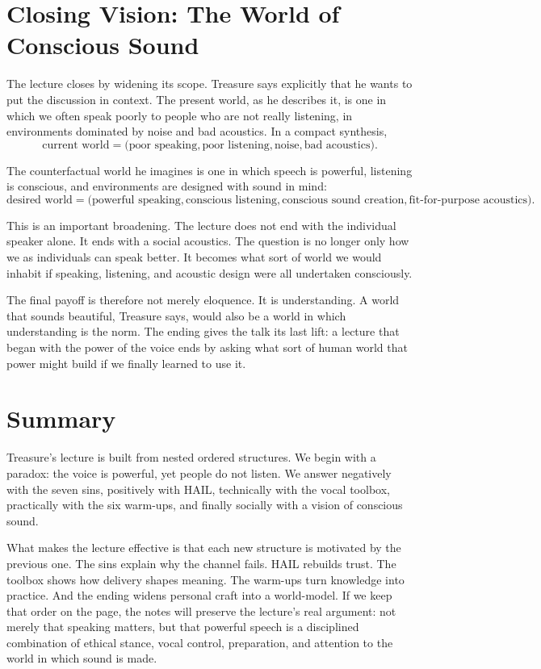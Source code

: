 \section{Closing Vision: The World of Conscious Sound}

The lecture closes by widening its scope. Treasure says explicitly that he wants to put the discussion in context. The present world, as he describes it, is one in which we often speak poorly to people who are not really listening, in environments dominated by noise and bad acoustics. In a compact synthesis,
\begin{equation}
\text{current world}
=
\bigl(
\text{poor speaking},
\text{poor listening},
\text{noise},
\text{bad acoustics}
\bigr).
\end{equation}

The counterfactual world he imagines is one in which speech is powerful, listening is conscious, and environments are designed with sound in mind:
\begin{equation}
\text{desired world}
=
\bigl(
\text{powerful speaking},
\text{conscious listening},
\text{conscious sound creation},
\text{fit-for-purpose acoustics}
\bigr).
\end{equation}

This is an important broadening. The lecture does not end with the individual speaker alone. It ends with a social acoustics. The question is no longer only how we as individuals can speak better. It becomes what sort of world we would inhabit if speaking, listening, and acoustic design were all undertaken consciously.

The final payoff is therefore not merely eloquence. It is understanding. A world that sounds beautiful, Treasure says, would also be a world in which understanding is the norm. The ending gives the talk its last lift: a lecture that began with the power of the voice ends by asking what sort of human world that power might build if we finally learned to use it.

\section{Summary}

Treasure's lecture is built from nested ordered structures. We begin with a paradox: the voice is powerful, yet people do not listen. We answer negatively with the seven sins, positively with HAIL, technically with the vocal toolbox, practically with the six warm-ups, and finally socially with a vision of conscious sound.

What makes the lecture effective is that each new structure is motivated by the previous one. The sins explain why the channel fails. HAIL rebuilds trust. The toolbox shows how delivery shapes meaning. The warm-ups turn knowledge into practice. And the ending widens personal craft into a world-model. If we keep that order on the page, the notes will preserve the lecture's real argument: not merely that speaking matters, but that powerful speech is a disciplined combination of ethical stance, vocal control, preparation, and attention to the world in which sound is made.